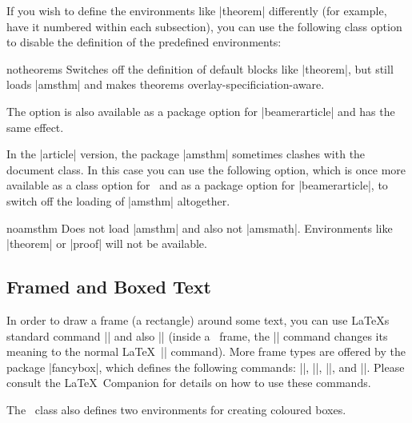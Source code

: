 If you wish to define the environments like |theorem| differently (for
example, have it numbered within each subsection), you can use the
following class option to disable the definition of the predefined
environments: 

\begin{classoption}{{notheorems}}
  Switches off the definition of default blocks like |theorem|, but
  still loads |amsthm| and makes theorems  
  overlay-specificiation-aware.
\end{classoption}

The option is also available as a package option for
|beamerarticle| and has the same effect.

\articlenote
In the |article| version, the package |amsthm| sometimes clashes with
the document class. In this case you can use the following option,
which is once more available as a class option for \beamer\ and as a
package option for |beamerarticle|, to switch off the loading of
|amsthm| altogether. 

\begin{classoption}{{noamsthm}}
  Does not load |amsthm| and also not |amsmath|. Environments like
  |theorem| or |proof| will not be available.
\end{classoption}




\subsection{Framed and Boxed Text}

In order to draw a frame (a rectangle) around some text, you can use
\LaTeX s standard command |\fbox| and also |\frame| (inside a \beamer{}, the |\frame| command changes its meaning to the normal \LaTeX\
|\frame| command). More frame types are offered by the
package |fancybox|, which defines the following commands:
|\shadowbox|, |\doublebox|, |\ovalbox|, and |\Ovalbox|. Please consult
the \LaTeX\ Companion for details on how to use these commands.

The \beamer\ class also defines two environments for creating coloured
boxes.

